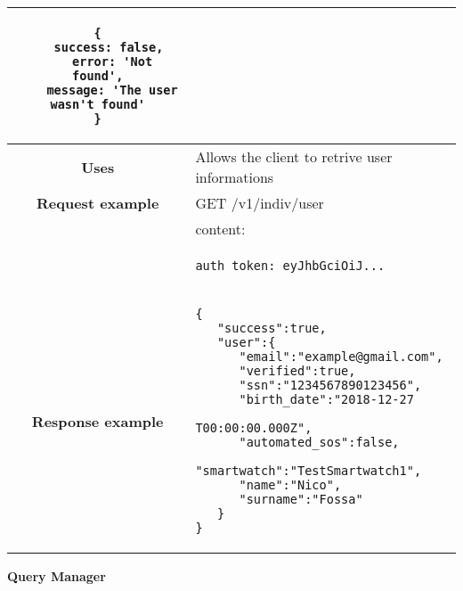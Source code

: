 \begin{adjustwidth}{1cm}{}
\begin{longtable}{|c|l|}
\begin{minipage}[t]{0.7\textwidth}
                \begin{adjustwidth}{1.5cm}{}
                \begin{verbatim}
{
    success: false, 
    error: 'Not found',
    message: 'The user wasn't found'
}
                \end{verbatim}
                \end{adjustwidth}
              \end{minipage} \\
              \hline
            \textbf{Uses} & Allows the client to retrive user informations \\
            \hline
               \textbf{Request example}
             & GET /v1/indiv/user \\
             & content: \\
            & \begin{minipage}[t]{0.5\textwidth}
                \begin{adjustwidth}{1.5cm}{}
                \begin{verbatim}
auth_token: eyJhbGciOiJ...
                \end{verbatim}
                \end{adjustwidth}
              \end{minipage} \\
            \hline
             \textbf{Response example} & 
              \begin{minipage}[t]{0.5\textwidth}
                \begin{adjustwidth}{1.5cm}{}
                \begin{verbatim}
{
   "success":true,
   "user":{
      "email":"example@gmail.com",
      "verified":true,
      "ssn":"1234567890123456",
      "birth_date":"2018-12-27
                    T00:00:00.000Z",
      "automated_sos":false,
      "smartwatch":"TestSmartwatch1",
      "name":"Nico",
      "surname":"Fossa"
   }
}
                \end{verbatim}
                \end{adjustwidth}
              \end{minipage} \\
              \hline
       
        \end{longtable}
    \end{adjustwidth}
   \textbf{Query Manager}
    

